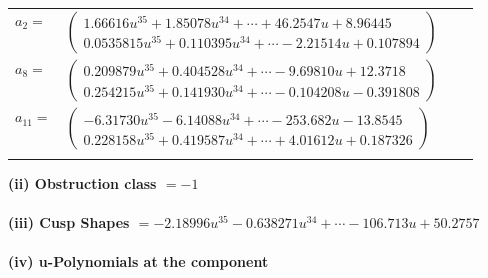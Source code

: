 \documentclass[1p]{elsarticle_modified}
\theoremstyle{definition}
\begin{document}
\begin{tabular}{m{7pt} m{180pt} m{7pt} m{180pt} }
\flushright $a_{2}=$&$\begin{pmatrix}1.66616 u^{35}+1.85078 u^{34}+\cdots+46.2547 u+8.96445\\0.0535815 u^{35}+0.110395 u^{34}+\cdots-2.21514 u+0.107894\end{pmatrix}$ \\
\flushright $a_{8}=$&$\begin{pmatrix}0.209879 u^{35}+0.404528 u^{34}+\cdots-9.69810 u+12.3718\\0.254215 u^{35}+0.141930 u^{34}+\cdots-0.104208 u-0.391808\end{pmatrix}$ \\
\flushright $a_{11}=$&$\begin{pmatrix}-6.31730 u^{35}-6.14088 u^{34}+\cdots-253.682 u-13.8545\\0.228158 u^{35}+0.419587 u^{34}+\cdots+4.01612 u+0.187326\end{pmatrix}$\\&\end{tabular}
\flushleft \textbf{(ii) Obstruction class $= -1$}\\~\\
\flushleft \textbf{(iii) Cusp Shapes $= -2.18996 u^{35}-0.638271 u^{34}+\cdots-106.713 u+50.2757$}\\~\\
\newpage\renewcommand{\arraystretch}{1}
\flushleft \textbf{(iv) u-Polynomials at the component}\newline \\
\end{document}
